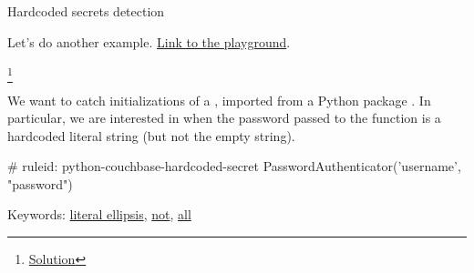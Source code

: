 \documentclass[aspectratio=169, handout]{beamer}
\newenvironment{exercisePage}[1]{
  \begin{minipage}[t][0.4in][t]{\textwidth}
    \Large \term{Exercise:} #1
  \end{minipage}
  \begin{minipage}[t][2.6in][t]{\textwidth}
}{
  \end{minipage}
}
\newcommand\blfootnote[1]{
    \begingroup
    \renewcommand\thefootnote{}\footnote{#1}
    \addtocounter{footnote}{-1}
    \endgroup
}
\newcommand\solutionLink[1]{
  \blfootnote{\color{blue}\href{#1}{Solution}}
}
\newcommand\patternNotLink[1][]{{\color{blue}\href{https://semgrep.dev/docs/writing-rules/rule-syntax\#pattern-not}{not}}}
\newcommand\patternAllLink[1][]{{\color{blue}\href{https://semgrep.dev/docs/writing-rules/rule-syntax\#patterns}{all}}}
\newcommand\literalEllipsisLink[1][]{{\color{blue}\href{https://semgrep.dev/docs/writing-rules/pattern-syntax\#strings}{literal ellipsis}}}
\begin{document}


\begin{frame}[fragile]
  \begin{exercisePage}{Hardcoded secrets detection}

  Let's do another example. {\color{blue}\href{https://semgrep.dev/playground/r/QrUWj3A/semgrep.find-unverified-transactions-exercise}{Link to the playground}}.
  \solutionLink{https://semgrep.dev/playground/r/4bURwNG/semgrep.find-unverified-transactions-exercise-solution}

  \vspace{\fill}

  We want to catch initializations of a , imported
  from a Python package . In particular, we are interested in
  when the password passed to the function is a hardcoded literal string (but not the empty string).

  \vspace{\fill}


  \vspace{\fill}

  \begin{codeblock}
    # ruleid: python-couchbase-hardcoded-secret
    PasswordAuthenticator('username', "password")
  \end{codeblock}

  \vspace{\fill}

  Keywords: \literalEllipsisLink, \patternNotLink, \patternAllLink
  \end{exercisePage}
\end{frame}
\end{document}
